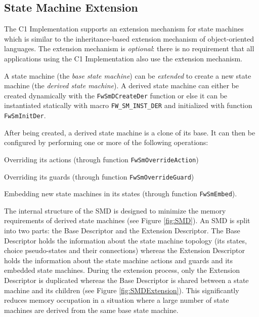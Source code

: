\documentclass[a4paper,10pt]{article}
\newenvironment{fw_itemize}						%
{\begin{itemize}
  \setlength{\itemsep}{1mm}
  \setlength{\parskip}{0pt}
  \setlength{\parsep}{0pt}}
{\end{itemize}}
\begin{document}
\subsection{State Machine Extension}
The C1 Implementation supports an extension mechanism for state machines which is similar to the inheritance-based 
extension mechanism of object-oriented languages. The extension mechanism is \emph{optional}: there is no requirement 
that all applications using the C1 Implementation also use the extension mechanism.



A state machine (the \emph{base state machine}) can be \emph{extended} to create a new state machine 
(the \emph{derived state machine}). A derived state machine can either be created dynamically with the 
\texttt{FwSmDCreateDer} function or else it can be instantiated statically with macro \texttt{FW\_SM\_INST\_DER} and 
initialized with function \texttt{FwSmInitDer}.



After being created, a derived state machine is a clone of its base. It can then be configured by performing 
one or more of the following operations: 

\begin{fw_itemize}
\item Overriding its actions (through function \texttt{FwSmOverrideAction})
\item Overriding its guards (through function \texttt{FwSmOverrideGuard}) 
\item Embedding new state machines in its states (through function \texttt{FwSmEmbed}).
\end{fw_itemize}

The internal structure of the SMD is designed to minimize the memory requirements of derived state machines
(see Figure \ref{fig:SMD}). An SMD is split into two parts: the Base Descriptor and the Extension 
Descriptor. The Base Descriptor holds the information about the state machine topology (its states, choice 
pseudo-states and their connections) whereas the Extension Descriptor holds the information about the state 
machine actions and guards and its embedded state machines. During the extension process, only the Extension 
Descriptor is duplicated whereas the Base Descriptor is shared between a state machine and its children 
(see Figure \ref{fig:SMDExtension}). This significantly reduces memory occupation in a situation where a 
large number of state machines are derived from the same base state machine. 
\end{document}

